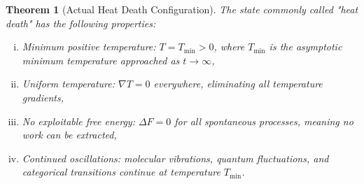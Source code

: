 \documentclass[12pt,a4paper]{article}
\newtheorem{theorem}{Theorem}[section]
\theoremstyle{definition}
\theoremstyle{remark}
\begin{document}
\begin{theorem}[Actual Heat Death Configuration]
\label{thm:actual_heat_death}
The state commonly called "heat death" has the following properties:
\begin{enumerate}[(i)]
    \item \emph{Minimum positive temperature}: $T = T_{\min} > 0$, where $T_{\min}$ is the asymptotic minimum temperature approached as $t \to \infty$,
    \item \emph{Uniform temperature}: $\nabla T = 0$ everywhere, eliminating all temperature gradients,
    \item \emph{No exploitable free energy}: $\Delta F = 0$ for all spontaneous processes, meaning no work can be extracted,
    \item \emph{Continued oscillations}: molecular vibrations, quantum fluctuations, and categorical transitions continue at temperature $T_{\min}$.
\end{enumerate}
\end{theorem}
\end{document}
